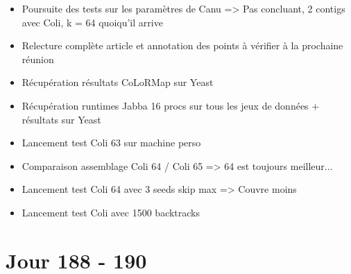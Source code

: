 \documentclass[12pt]{report}
\begin{document}
\begin{itemize}
	\item Poursuite des tests sur les paramètres de Canu => Pas concluant, 2 contigs avec Coli, k = 64 quoiqu'il arrive
	
	\item Relecture complète article et annotation des points à vérifier à la prochaine réunion
	
	\item Récupération résultats CoLoRMap sur Yeast
	
	\item Récupération runtimes Jabba 16 procs sur tous les jeux de données + résultats sur Yeast
	
	\item Lancement test Coli 63 sur machine perso 
	
	\item Comparaison assemblage Coli 64 / Coli 65 => 64 est toujours meilleur...
	
	\item Lancement test Coli 64 avec 3 seeds skip max => Couvre moins
	
	\item Lancement test Coli avec 1500 backtracks
\end{itemize}

\section{Jour 188 - 190}
\end{document}

